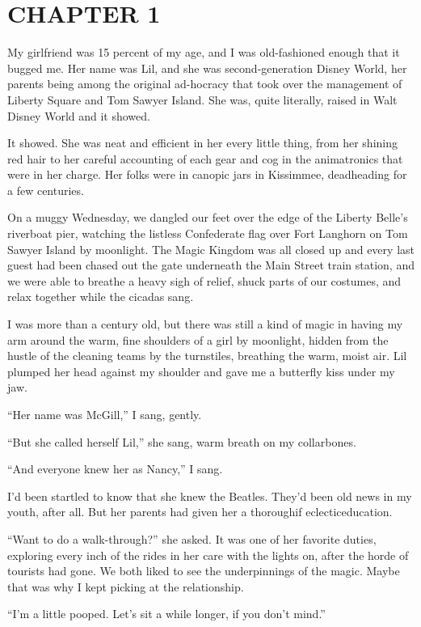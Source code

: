 \section{CHAPTER 1}

My girlfriend was 15 percent of my age, and I was old-fashioned
enough that it bugged me. Her name was Lil, and she was
second-generation Disney World, her parents being among the
original ad-hocracy that took over the management of Liberty Square
and Tom Sawyer Island. She was, quite literally, raised in Walt
Disney World and it showed.

It showed. She was neat and efficient in her every little thing,
from her shining red hair to her careful accounting of each gear
and cog in the animatronics that were in her charge. Her folks were
in canopic jars in Kissimmee, deadheading for a few centuries.

On a muggy Wednesday, we dangled our feet over the edge of the
Liberty Belle's riverboat pier, watching the listless Confederate
flag over Fort Langhorn on Tom Sawyer Island by moonlight. The
Magic Kingdom was all closed up and every last guest had been
chased out the gate underneath the Main Street train station, and
we were able to breathe a heavy sigh of relief, shuck parts of our
costumes, and relax together while the cicadas sang.

I was more than a century old, but there was still a kind of magic
in having my arm around the warm, fine shoulders of a girl by
moonlight, hidden from the hustle of the cleaning teams by the
turnstiles, breathing the warm, moist air. Lil plumped her head
against my shoulder and gave me a butterfly kiss under my jaw.

“Her name was McGill,” I sang, gently.

“But she called herself Lil,” she sang, warm breath on my
collarbones.

“And everyone knew her as Nancy,” I sang.

I'd been startled to know that she knew the Beatles. They'd been
old news in my youth, after all. But her parents had given her a
thorough{\dash}if eclectic{\dash}education.

“Want to do a walk-through?” she asked. It was one of her favorite
duties, exploring every inch of the rides in her care with the
lights on, after the horde of tourists had gone. We both liked to
see the underpinnings of the magic. Maybe that was why I kept
picking at the relationship.

“I'm a little pooped. Let's sit a while longer, if you don't
mind.”

